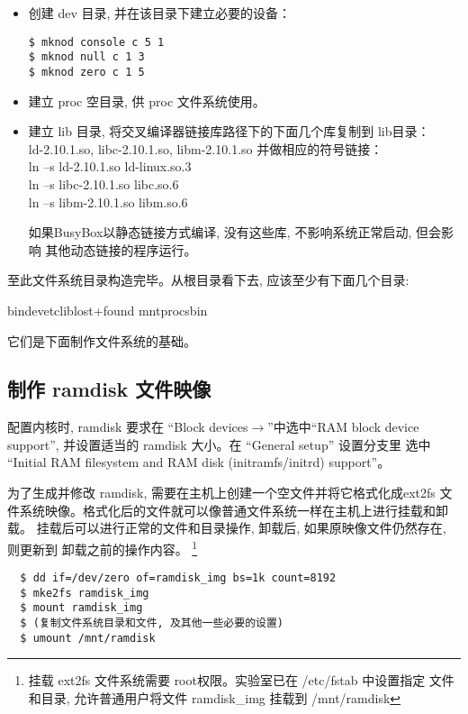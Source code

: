 \begin{itemize}
  \item 创建 dev 目录, 并在该目录下建立必要的设备：
\begin{verbatim}
$ mknod console c 5 1
$ mknod null c 1 3
$ mknod zero c 1 5
\end{verbatim}

  \item 建立 proc 空目录, 供 proc 文件系统使用。
  \item 建立 lib 目录, 将交叉编译器链接库路径下的下面几个库复制到 lib目录：\\
		ld-2.10.1.so, libc-2.10.1.so, libm-2.10.1.so 并做相应的符号链接：\\
		ln --s ld-2.10.1.so ld-linux.so.3\\
		ln --s libc-2.10.1.so libc.so.6\\
		ln --s libm-2.10.1.so libm.so.6

		如果BusyBox以静态链接方式编译, 没有这些库, 不影响系统正常启动, 但会影响
		其他动态链接的程序运行。
\end{itemize}

	至此文件系统目录构造完毕。从根目录看下去, 应该至少有下面几个目录:

	bin\qquad  dev\qquad  etc\qquad  lib\qquad lost+found\qquad
	mnt\qquad proc\qquad sbin

    它们是下面制作文件系统的基础。

\subsection{制作 ramdisk 文件映像}
	配置内核时, ramdisk 要求在 ``Block devices$\to$''中选中``RAM block
device support'', 并设置适当的 ramdisk 大小。在 ``General setup'' 设置分支里
选中 ``Initial RAM filesystem and RAM disk (initramfs/initrd) support''。

	为了生成并修改 ramdisk, 需要在主机上创建一个空文件并将它格式化成ext2fs
文件系统映像。格式化后的文件就可以像普通文件系统一样在主机上进行挂载和卸载。
挂载后可以进行正常的文件和目录操作, 卸载后, 如果原映像文件仍然存在, 则更新到
卸载之前的操作内容。
\footnote{ 挂载 ext2fs 文件系统需要 root权限。实验室已在 /etc/fstab 中设置指定
文件和目录, 允许普通用户将文件 ramdisk\_img 挂载到 /mnt/ramdisk}

\begin{boxedminipage}{.9\textwidth}
\begin{verbatim}
  $ dd if=/dev/zero of=ramdisk_img bs=1k count=8192
  $ mke2fs ramdisk_img
  $ mount ramdisk_img
  $ (复制文件系统目录和文件, 及其他一些必要的设置)
  $ umount /mnt/ramdisk
\end{verbatim}
\end{boxedminipage}

